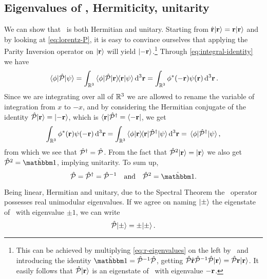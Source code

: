         \subsection{Eigenvalues of \hP, Hermiticity, unitarity}
            We can show that \hP\ is both Hermitian and unitary. Starting from $\hat{\vb{r}}\!\ket{\vb{r}} = \vb{r}\!\ket{\vb{r}}$ and by looking at \eqref{eq:lorentz-P}, it is easy to convince ourselves that applying the Parity Inversion operator on $\ket{\vb{r}}$ will yield $\ket{-\vb{r}}$.\footnote{This can be achieved by multiplying \eqref{eq:r-eigenvalues} on the left by \hP\ and introducing the identity $\hidM = \hP^{-1}\hP$, getting $\mathcal{\hat{P}}\hat{\vb{r}}\mathcal{\hat{P}}^{-1}\mathcal{\hat{P}}\!\ket{\vb{r}} = \mathcal{\hat{P}}\vb{r}\!\ket{\vb{r}}$. It easily follows that $\mathcal{\hat{P}}\!\ket{\vb{r}}$ is an eigenstate of \hvr\ with eigenvalue $-\vb{r}$.} Through \eqref{eq:integral-identity} we have
            \begin{equation*}
                \mel{\phi}{\hP}{\psi}
                = \int\nolimits_{\bbR^3}\bra{\phi}\!\hP\!\ket{\vb{r}}\!\!\bra{\vb{r}}\ket{\psi}\dd[3]{\vb{r}}
                = \int\nolimits_{\bbR^3}\phi^*\pqty{-\vb{r}}\psi\pqty{\vb{r}}\dd[3]{\vb{r}}
                \myperiod
            \end{equation*}
            Since we are integrating over all of $\mathbb{R}^3$ we are allowed to rename the variable of integration from $x$ to $-x$, and by considering the Hermitian conjugate of the identity $\mathcal{\hat{P}}\!\ket{\vb{r}} = \ket{-\vb{r}}$, which is $\bra{\vb{r}}\!\mathcal{\hat{P}}^\dag = \bra{-\vb{r}}$, we get
            \begin{equation*}
                \int\nolimits_{\bbR^3}\phi^*\pqty{\vb{r}}\psi\pqty{-\vb{r}}\dd[3]{\vb{r}}
                = \int\nolimits_{\bbR^3}\bra{\phi}\ket{\vb{r}}\!\!\bra{\vb{r}}\!\hP^\dag\!\ket{\psi}\dd[3]{\vb{r}}
                = \mel{\phi}{\hP^\dag}{\psi}
                \mycomma
            \end{equation*}
            from which we see that $\mathcal{\hat{P}}^\dag = \mathcal{\hat{P}}$. From the fact that $\mathcal{\hat{P}}^2\!\ket{\vb{r}} = \ket{\vb{r}}$ we also get $\hP^2 = \hidM$, implying unitarity. To sum up,
            \begin{equation}
                \label{eq:P-properties}
                \hP
                = \hP^\dag
                = \hP^{-1}
                \qand
                \hP^2
                = \togglehat{\idM}
                \myperiod
            \end{equation}

            Being linear, Hermitian and unitary, due to the Spectral Theorem the \hP\ operator possesses real unimodular eigenvalues. If we agree on naming $\ket{\pm}$ the eigenstate of \hP\ with eigenvalue $\pm 1$, we can write
            \begin{equation}
                \label{eq:eigenvalue-problem-P}
                \mathcal{\hat{P}}\!\ket{\pm}
                = \pm\!\ket{\pm}\text{.}
            \end{equation}
        
